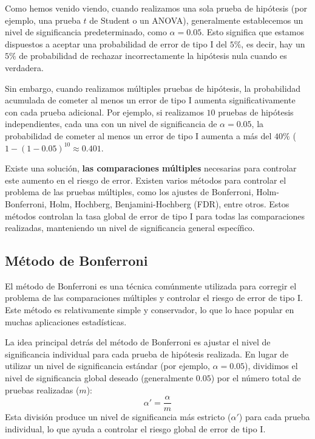 \documentclass[
  letterpaper,
  DIV=11,
  numbers=noendperiod]{scrreprt}
\begin{document}
Como hemos venido viendo, cuando realizamos una sola prueba de hipótesis
(por ejemplo, una prueba \(t\) de Student o un ANOVA), generalmente
establecemos un nivel de significancia predeterminado, como
\(\alpha = 0.05\). Esto significa que estamos dispuestos a aceptar una
probabilidad de error de tipo I del \(5\%\), es decir, hay un \(5\%\) de
probabilidad de rechazar incorrectamente la hipótesis nula cuando es
verdadera.

Sin embargo, cuando realizamos múltiples pruebas de hipótesis, la
probabilidad acumulada de cometer al menos un error de tipo I aumenta
significativamente con cada prueba adicional. Por ejemplo, si realizamos
\(10\) pruebas de hipótesis independientes, cada una con un nivel de
significancia de \(\alpha = 0.05\), la probabilidad de cometer al menos
un error de tipo I aumenta a más del \(40\%\)
(\(1-(1-0.05)^{10}\approx 0.401\).

Existe una solución, \textbf{las comparaciones múltiples} necesarias
para controlar este aumento en el riesgo de error. Existen varios
métodos para controlar el problema de las pruebas múltiples, como los
ajustes de Bonferroni, Holm-Bonferroni, Holm, Hochberg,
Benjamini-Hochberg (FDR), entre otros. Estos métodos controlan la tasa
global de error de tipo I para todas las comparaciones realizadas,
manteniendo un nivel de significancia general específico.

\hypertarget{muxe9todo-de-bonferroni}{%
\subsection{Método de Bonferroni}\label{muxe9todo-de-bonferroni}}

El método de Bonferroni es una técnica comúnmente utilizada para
corregir el problema de las comparaciones múltiples y controlar el
riesgo de error de tipo I. Este método es relativamente simple y
conservador, lo que lo hace popular en muchas aplicaciones estadísticas.

La idea principal detrás del método de Bonferroni es ajustar el nivel de
significancia individual para cada prueba de hipótesis realizada. En
lugar de utilizar un nivel de significancia estándar (por ejemplo,
\(\alpha = 0.05\)), dividimos el nivel de significancia global deseado
(generalmente \(0.05\)) por el número total de pruebas realizadas
(\(m\)): \[
\alpha' = \frac{\alpha}{m}
\] Esta división produce un nivel de significancia más estricto
(\(\alpha'\)) para cada prueba individual, lo que ayuda a controlar el
riesgo global de error de tipo I.
\end{document}
